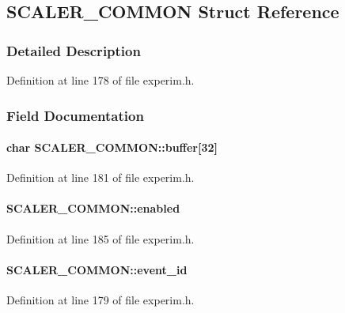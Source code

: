 \subsection{SCALER\_\-COMMON Struct Reference}
\label{structSCALER__COMMON}


\subsubsection{Detailed Description}


Definition at line 178 of file experim.h.

\subsubsection{Field Documentation}
\paragraph[{buffer}]{\setlength{\rightskip}{0pt plus 5cm}char {\bf SCALER\_\-COMMON::buffer}\mbox{[}32\mbox{]}}\hfill\label{structSCALER__COMMON_a38252bb5dbe7714414c827773d58b652}


Definition at line 181 of file experim.h.
\paragraph[{enabled}]{ {\bf SCALER\_\-COMMON::enabled}}\hfill\label{structSCALER__COMMON_a17f8657fed9d88b5e4a2ba3f5f0cec1c}


Definition at line 185 of file experim.h.
\paragraph[{event\_\-id}]{ {\bf SCALER\_\-COMMON::event\_\-id}}\hfill\label{structSCALER__COMMON_a023d092b249c52bfc2e0e504ee7722d1}


Definition at line 179 of file experim.h.
